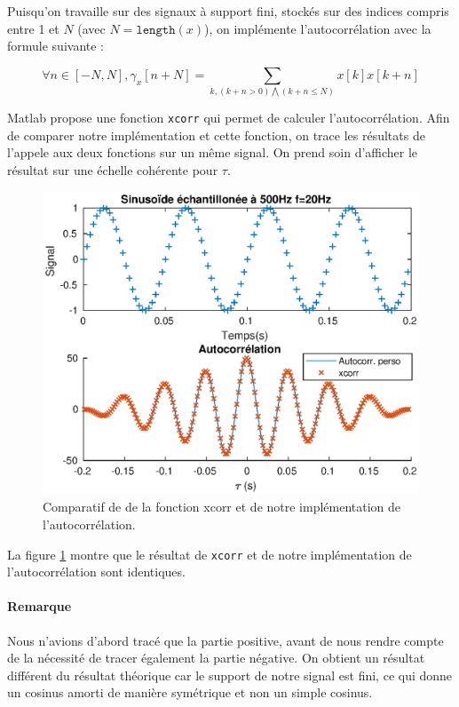 \documentclass[french]{article}
\begin{document}
Puisqu'on travaille sur des signaux à support fini, stockés sur des indices compris entre 1 et $N$ (avec $N = \mathtt{length}(x)$), on implémente l'autocorrélation avec la formule suivante :

\begin{equation}
\forall n \in [-N,N], \gamma_x [n+N] = \sum_{k, (k+n>0) \bigwedge (k+n \leq N) } x[k]x[k+n]
\end{equation}

Matlab propose une fonction \verb`xcorr` qui permet de calculer l'autocorrélation. Afin de comparer notre implémentation et cette fonction, on trace les résultats de l'appele aux deux fonctions sur un même signal. On prend soin d'afficher le résultat sur une échelle cohérente pour $\tau$.

\begin{figure}[h!]
	\centering
	\includegraphics[height=0.33\textheight]{images/autocorr.eps}
	\caption{Comparatif de de la fonction xcorr et de notre implémentation de l'autocorrélation.}
	\label{autocorr}
\end{figure}

La figure \ref{autocorr} montre que le résultat de \verb`xcorr` et de notre implémentation de l'autocorrélation sont identiques.

\paragraph{Remarque}
Nous n'avions d'abord tracé que la partie positive, avant de nous rendre compte de la nécessité de tracer également la partie négative.
On obtient un résultat différent du résultat théorique car le support de notre signal est fini, ce qui donne un cosinus amorti de manière symétrique et non un simple cosinus.
\end{document}
